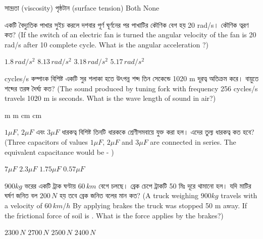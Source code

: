 \documentclass[addpoints]{exam}
\begin{document}
\begin{questions}
\begin{oneparchoices}
\choice সান্দ্রতা (viscosity)
\choice পৃষ্ঠটান (surface tension)
\choice Both
\choice None
\end{oneparchoices}

\question  একটি বৈদ্যুতিক পাখার সুইচ  করলে দশবার পূর্ণ ঘূর্ণনের পর পাখাটির কৌণিক বেগ হয় 20 rad/s। কৌণিক ত্বরণ কত? (If the switch of an electric fan is turned  the angular velocity of the fan is 20 rad/s after 10 complete cycle. What is the angular acceleration ?) 

\begin{oneparchoices}
\choice $ 1.8\,rad/s^{2} $
\choice $ 8.13\,rad/s^{2} $
\choice $ 3.18\,rad/s^{2} $
\choice $ 5.17\,rad/s^{2} $

\end{oneparchoices}


 cycles/s কম্পাংক বিশিষ্ট একটি সুর শলাকা হতে উৎপন্ন শব্দ তিন সেকেন্ডে 1020 m দূরত্ব অতিক্রম করে। বায়ুতে শব্দের তরঙ্গ দৈর্ঘ্য কত? (The sound produced by tuning fork with frequency 256 cycles/s travels 1020 m is seconds. What is the wave length of sound in air?)

\begin{oneparchoices}
 m
 m
 cm
 cm
\end{oneparchoices}

\question $ 1\mu F,\, 2\mu F$ এবং $ 3\mu F $ ধারকত্ব বিশিষ্ট তিনটি ধারককে শ্রেণীসমবায়ে যুক্ত করা হল। এদের তুল্য ধারকত্ব কত হবে? (Three capacitors of values $ 1\mu F,\, 2\mu F$ and $ 3\mu F $ are connected in series. The equivalent capacitance would be - ) 

\begin{oneparchoices}
\choice $ 7\mu F $
\choice $ 2.3\mu F $
\choice $ 1.75\mu F $
\choice $ 0.57\mu F $

\end{oneparchoices}

\question  $ 900kg $ ভরের একটি ট্রাক ঘণ্টায় $ 60\,km $ বেগে চলছে। ব্রেক চেপে ট্রাকটি 50 মিঃ দূরে থামানো হল। যদি মাটির ঘর্ষণ জনিত বল $ 200\,N $ হয় তবে ব্রেক জনিত বলের মান কত? (A truck weighing $ 900kg $ travels with a velocity of $ 60\,km/h $ By applying brakes the truck was stopped 50 m away. If the frictional force of soil is . What is the force applies by the brakes?) 

\begin{oneparchoices}
\choice $ 2300\,N $
\choice $ 2700\,N $
\choice $ 2500\,N $
\choice $ 2400\,N $


\end{oneparchoices}
\end{questions}
\end{document}
